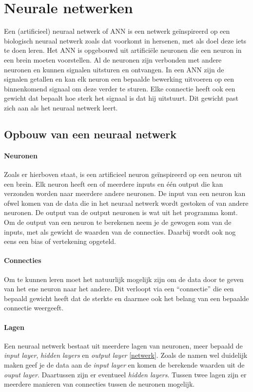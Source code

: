 \documentclass[a4paper,twoside,kulak]{kulakreport}
\begin{document}
\section{Neurale netwerken}
Een (artificieel) neuraal netwerk of ANN is een netwerk geïnspireerd op een biologisch neuraal netwerk zoals dat voorkomt in hersenen, met als doel deze iets te doen leren. Het ANN is opgebouwd uit artificiële neuronen die een neuron in een brein moeten voorstellen. Al de neuronen zijn verbonden met andere neuronen en kunnen signalen uitsturen en ontvangen. In een ANN zijn de signalen getallen en kan elk neuron een bepaalde bewerking uitvoeren op een binnenkomend signaal om deze verder te sturen. Elke connectie heeft ook een gewicht dat bepaalt hoe sterk het signaal is dat hij uitstuurt. Dit gewicht past zich aan als het neuraal netwerk leert. 

\subsection{Opbouw van een neuraal netwerk}
\paragraph{Neuronen}
Zoals er hierboven staat, is een artificieel neuron geïnspireerd op een neuron uit een brein. Elk neuron heeft een of meerdere inputs en één output die kan verzonden worden naar meerdere andere neuronen. De input van een neuron kan ofwel komen van de data die in het neuraal netwerk wordt gestoken of van andere neuronen. De output van de output neuronen is wat uit het programma komt. Om de output van een neuron te berekenen neem je de gewogen som van de inputs, met als gewicht de waarden van de connecties. Daarbij wordt ook nog eens een bias of vertekening opgeteld.

\paragraph{Connecties}
Om te kunnen leren moet het natuurlijk mogelijk zijn om de data door te geven van het ene neuron naar het andere. Dit verloopt via een “connectie” die een bepaald gewicht heeft dat de sterkte en daarmee ook het belang van een bepaalde connectie weergeeft.

\paragraph{Lagen}
Een neuraal netwerk bestaat uit meerdere lagen van neuronen, meer bepaald de \emph{input layer}, \emph{hidden layers} en \emph{output layer} \ref{netwerk}. Zoals de namen wel duidelijk maken geef je de data aan de \emph{input layer} en komen de berekende waarden uit de \emph{ouput layer}. Daartussen zijn er eventueel \emph{hidden layers}. Tussen twee lagen zijn er meerdere manieren van connecties tussen de neuronen mogelijk.
\end{document}
